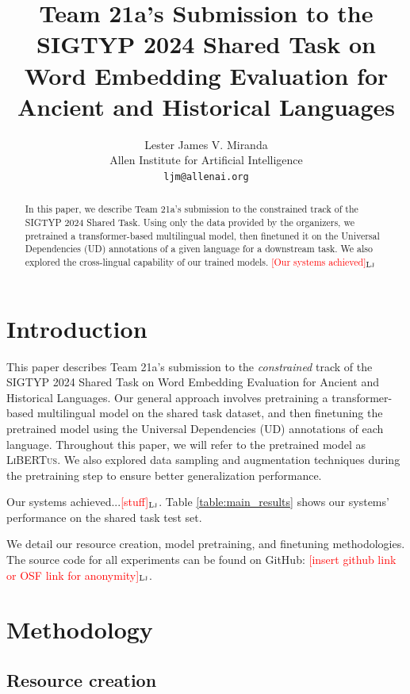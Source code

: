 \documentclass[11pt]{article}
\title{Team 21a's Submission to the SIGTYP 2024 Shared Task on Word Embedding Evaluation for Ancient and Historical Languages}
\author{Lester James V. Miranda \\
  Allen Institute for Artificial Intelligence \\
  \texttt{ljm@allenai.org} \\
}
\newcommand{\draftonly}[1]{#1}
\newcommand{\draftcomment}[3]{\draftonly{\textcolor{#2}{[#3]{$_{\textsc{#1}}$}}}}
\newcommand{\lj}[1]{\draftcomment{Lj}{red}{#1}}
\newcommand{\libertus}{\textsc{LiBERTus}}
\begin{document}
\maketitle

\begin{abstract}
In this paper, we describe Team 21a's submission to the constrained track of the SIGTYP 2024 Shared Task.
Using only the data provided by the organizers, we pretrained a transformer-based multilingual model, then finetuned it on the Universal Dependencies (UD) annotations of a given language for a downstream task.
We also explored the cross-lingual capability of our trained models.
\lj{Our systems achieved}
\end{abstract}

\section{Introduction}
This paper describes Team 21a's submission to the \textit{constrained} track of the SIGTYP 2024 Shared Task on Word Embedding Evaluation for Ancient and Historical Languages.
Our general approach involves pretraining a transformer-based multilingual model on the shared task dataset, and then finetuning the pretrained model using the Universal Dependencies (UD) annotations of each language.
Throughout this paper, we will refer to the pretrained model as \libertus{}.
We also explored data sampling and augmentation techniques during the pretraining step to ensure better generalization performance.

Our systems achieved...\lj{stuff}. 
Table \ref{table:main_results} shows our systems' performance on the shared task test set.


We detail our resource creation, model pretraining, and finetuning methodologies.
The source code for all experiments can be found on GitHub: \lj{insert github link or OSF link for anonymity}.



\section{Methodology}

\subsection{Resource creation}
\end{document}

